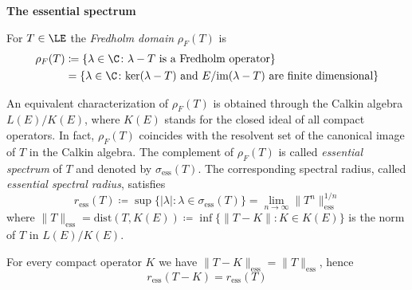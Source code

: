 \begin{example}{\textbf{The essential spectrum}}
\label{subsec:a3-3.7}	

For $T \in \LE$ the \emph{Fredholm domain} $\rho_{F}(T)$ is
\begin{align*}\label{eq:a3-3.5}
\rho_{F}(T) & \coloneqq  \{\lambda \in \C \colon \lambda - T \text{ is a Fredholm operator}\}\\
& =  \{\lambda \in \C \colon \text{ker}(\lambda - T) \text{ and } E/\text{im}(\lambda - T) \text{ are finite dimensional}\}
\end{align*}

An equivalent characterization of $\rho_{F}(T)$ is obtained through the Calkin algebra $L(E)/K(E)$, where $K(E)$ stands for the closed ideal of all compact operators.
In fact, $\rho_{F}(T)$ coincides with the resolvent set of the canonical image of $T$ in the Calkin algebra.
The complement of $\rho_{F}(T)$ is called \emph{essential spectrum} of $T$ and denoted by $\sigma_{\text{ess}}(T)$.
The corresponding spectral radius, called \emph{essential spectral radius}, satisfies
\begin{equation}\label{eq:a3-3.5}
r_{\text{ess}}(T) \coloneqq \sup \{|\lambda| \colon \lambda \in \sigma_{\text{ess}}(T)\} = \lim_{n \to \infty} \|T^{n}\|_{\text{ess}}^{1/n}
\end{equation}
where $\|T\|_{\text{ess}} = \text{dist}(T,K(E)) \coloneqq \inf \{\|T - K\| \colon K \in K(E)\}$ is the norm of $T$ in $L(E)/K(E)$.

For every compact operator $K$ we have $\|T - K\|_{\text{ess}} = \|T\|_{\text{ess}}$, hence
\begin{equation}\label{eq:a3-3.6}
r_{\text{ess}}(T - K) = r_{\text{ess}}(T)
\end{equation}



\end{example}
